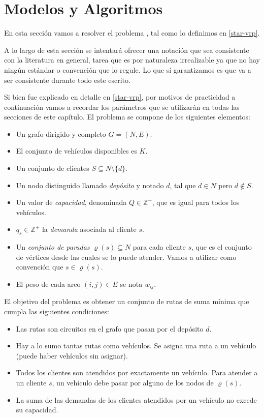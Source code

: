 \chapter{Modelos y Algoritmos}
\label{chapter:algoritmos}

En esta sección vamos a resolver el problema , tal como lo definimos en \ref{star-vrp}.

A lo largo de esta sección se intentará ofrecer una notación que sea consistente con la literatura en general, tarea que es por naturaleza irrealizable ya que no hay ningún estándar o convención que lo regule. Lo que sí garantizamos es que va a ser consistente durante todo este escrito.

Si bien fue explicado en detalle en \ref{star-vrp}, por motivos de practicidad a continuación vamos a recordar los parámetros que se utilizarán en todas las secciones de este capítulo. El problema se compone de los siguientes elementos:

\begin{itemize}
    \item Un grafo dirigido y completo $G = (N, E)$.
    \item El conjunto de vehículos disponibles es $K$.
    \item Un conjunto de clientes $S \subseteq N \setminus \{d\}$.
    \item Un nodo distinguido llamado \emph{depósito} y notado $d$, tal que $d \in N$ pero $d \notin S$.
    \item Un valor de \emph{capacidad}, denominada $Q \in \mathbb{Z}^{+}$, que es igual para todos los vehículos.
    \item  $q_s \in \mathbb{Z}^{+}$ la \emph{demanda} asociada al cliente $s$.
    \item Un \emph{conjunto de paradas} $\varrho(s) \subseteq N$ para cada cliente $s$, que es el conjunto de vértices desde las cuales se lo puede atender. Vamos a utilizar como convención que $s \in \varrho(s)$.
    \item El peso de cada arco $(i, j) \in E$ se nota $w_{ij}$.
\end{itemize}

El objetivo del problema es obtener un conjunto de rutas de suma mínima que cumpla las siguientes condiciones:

\begin{itemize}
\label{list:restrictions}
    \item Las rutas son circuitos en el grafo que pasan por el depósito $d$.
    \item Hay a lo sumo tantas rutas como vehículos. Se asigna una ruta a un vehículo (puede haber vehículos sin asignar).
    \item Todos los clientes son atendidos por exactamente un vehículo. Para atender a un cliente $s$, un vehículo debe pasar por alguno de los nodos de $\varrho(s)$.
    \item La suma de las demandas de los clientes atendidos por un vehículo no excede su capacidad.
\end{itemize}

